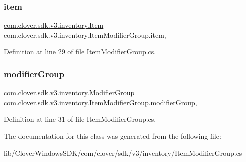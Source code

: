 \subsubsection{\texorpdfstring{item}{item}}
{\footnotesize\ttfamily \hyperlink{classcom_1_1clover_1_1sdk_1_1v3_1_1inventory_1_1_item}{com.\+clover.\+sdk.\+v3.\+inventory.\+Item} com.\+clover.\+sdk.\+v3.\+inventory.\+Item\+Modifier\+Group.\+item\hspace{0.3cm}{\ttfamily [get]}, {\ttfamily [set]}}



Definition at line 29 of file Item\+Modifier\+Group.\+cs.

\mbox{\label{classcom_1_1clover_1_1sdk_1_1v3_1_1inventory_1_1_item_modifier_group_a0f5080c613ec235d5374f51666563130}} 
\subsubsection{\texorpdfstring{modifier\+Group}{modifierGroup}}
{\footnotesize\ttfamily \hyperlink{classcom_1_1clover_1_1sdk_1_1v3_1_1inventory_1_1_modifier_group}{com.\+clover.\+sdk.\+v3.\+inventory.\+Modifier\+Group} com.\+clover.\+sdk.\+v3.\+inventory.\+Item\+Modifier\+Group.\+modifier\+Group\hspace{0.3cm}{\ttfamily [get]}, {\ttfamily [set]}}



Definition at line 31 of file Item\+Modifier\+Group.\+cs.



The documentation for this class was generated from the following file\+:\begin{DoxyCompactItemize}
\item 
lib/\+Clover\+Windows\+S\+D\+K/com/clover/sdk/v3/inventory/Item\+Modifier\+Group.\+cs\end{DoxyCompactItemize}
